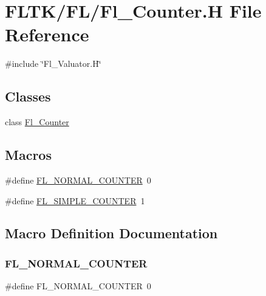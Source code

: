 \hypertarget{_fl___counter_8_h}{}\section{F\+L\+T\+K/\+F\+L/\+Fl\+\_\+\+Counter.H File Reference}
\label{_fl___counter_8_h}
{\ttfamily \#include \char`\"{}Fl\+\_\+\+Valuator.\+H\char`\"{}}\newline
\subsection*{Classes}
\begin{DoxyCompactItemize}
\item 
class \hyperlink{class_fl___counter}{Fl\+\_\+\+Counter}
\end{DoxyCompactItemize}
\subsection*{Macros}
\begin{DoxyCompactItemize}
\item 
\#define \hyperlink{_fl___counter_8_h_aea135cf251e75f2d045f75e7aabf102f}{F\+L\+\_\+\+N\+O\+R\+M\+A\+L\+\_\+\+C\+O\+U\+N\+T\+ER}~0
\item 
\#define \hyperlink{_fl___counter_8_h_a9a5072fb994d1c4527d20fc5c469e6d5}{F\+L\+\_\+\+S\+I\+M\+P\+L\+E\+\_\+\+C\+O\+U\+N\+T\+ER}~1
\end{DoxyCompactItemize}


\subsection{Macro Definition Documentation}
\mbox{\label{_fl___counter_8_h_aea135cf251e75f2d045f75e7aabf102f}} 
\subsubsection{\texorpdfstring{F\+L\+\_\+\+N\+O\+R\+M\+A\+L\+\_\+\+C\+O\+U\+N\+T\+ER}{FL\_NORMAL\_COUNTER}}
{\footnotesize\ttfamily \#define F\+L\+\_\+\+N\+O\+R\+M\+A\+L\+\_\+\+C\+O\+U\+N\+T\+ER~0}

